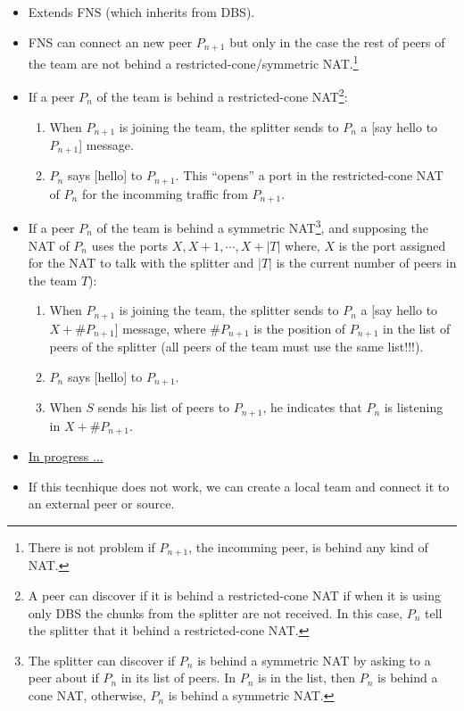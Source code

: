 \documentclass{article}
\begin{document}
\begin{itemize}
\item Extends FNS (which inherits from DBS).
\item FNS can connect an new peer $P_{n+1}$ but only in the case the rest of
  peers of the team are not behind a restricted-cone/symmetric
  NAT.\footnote{There is not problem if $P_{n+1}$, the incomming peer, is
    behind any kind of NAT.}
\item If a peer $P_n$ of the team is behind a restricted-cone
  NAT\footnote{A peer can discover if it is behind a restricted-cone
    NAT if when it is using only DBS the chunks from the splitter are
    not received. In this case, $P_n$ tell the splitter that it behind
    a restricted-cone NAT.}:
  \begin{enumerate}
  \item When $P_{n+1}$ is joining the team, the splitter sends to
    $P_n$ a [say hello to $P_{n+1}$] message.
  \item $P_n$ says [hello] to $P_{n+1}$. This ``opens'' a port in the
    restricted-cone NAT of $P_n$ for the incomming traffic from $P_{n+1}$.
  \end{enumerate}

\item If a peer $P_n$ of the team is behind a symmetric
  NAT\footnote{The splitter can discover if $P_n$ is behind a
    symmetric NAT by asking to a peer about if $P_n$ in its list of
    peers. In $P_n$ is in the list, then $P_n$ is behind a cone NAT,
    otherwise, $P_n$ is behind a symmetric NAT.}, and supposing the
  NAT of $P_n$ uses the ports $X, X+1, \cdots, X+|T|$ where, $X$ is the port assigned
  for the NAT to talk with the splitter and $|T|$ is the current
  number of peers in the team $T$):
  \begin{enumerate}
  \item When $P_{n+1}$ is joining the team, the splitter sends to
    $P_n$ a [say hello to $X+\#P_{n+1}$] message, where $\#P_{n+1}$ is
    the position of $P_{n+1}$ in the list of peers of the splitter
    (all peers of the team must use the same list!!!).
  \item $P_n$ says [hello] to $P_{n+1}$.
  \item When $S$ sends his list of peers to $P_{n+1}$, he indicates
    that $P_n$ is listening in $X+\#P_{n+1}$.
  \end{enumerate}
\item
  \href{http://www.p2psp.org/en/p2psp-protocol?cap=indexsu13.xht#x22-180004.13}{In
    progress ...}
\item If this tecnhique does not work, we can create a local team and
  connect it to an external peer or source.
\end{itemize}
\end{document}
